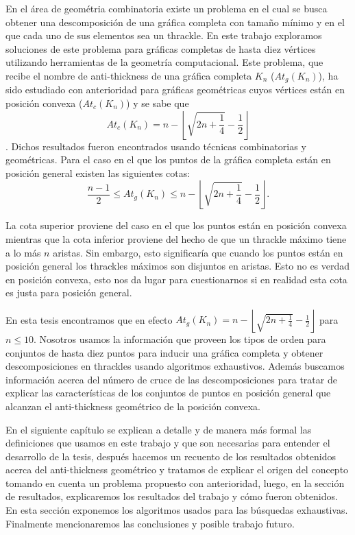 En el área de geométria combinatoria existe un problema en el cual se busca
obtener una descomposición de una gráfica completa con tamaño mínimo y en el
que cada uno de sus elementos sea un thrackle. En este trabajo exploramos
soluciones de este problema para gráficas completas de hasta diez vértices
utilizando herramientas de la geometría computacional.
Este problema, que recibe el nombre de anti-thickness de una gráfica completa $K_n$ ($At_g(K_n)$), ha sido estudiado con anterioridad %
para gráficas geométricas cuyos vértices están en posición convexa ($At_c(K_n)$)
y se sabe que \[At_c(K_n) = n - \left\lfloor\sqrt{2n + \frac{1}{4}}- \frac{1}{2}\right\rfloor\].
Dichos resultados fueron encontrados usando técnicas combinatorias y geométricas.
Para el caso en el que los puntos de la gráfica completa están
en posición general existen las siguientes cotas:
\[ \frac{n-1}{2} \leq At_g(K_n) \leq n - \left\lfloor\sqrt{2n + \frac{1}{4}}- \frac{1}{2}\right\rfloor.\]

La cota superior proviene del caso en el que los puntos están en posición convexa
mientras que la cota inferior proviene del hecho de que un thrackle máximo tiene
a lo más $n$ aristas. Sin embargo, esto significaría que cuando los puntos
están en posición general los thrackles máximos son disjuntos en aristas. Esto
no es verdad en posición convexa, esto nos da lugar para cuestionarnos si en realidad
esta cota es justa para posición general.

En esta tesis encontramos que en efecto $At_g(K_n) = n - \left\lfloor\sqrt{2n + \frac{1}{4}}- \frac{1}{2}\right\rfloor$ para $n\leq 10$.
Nosotros usamos la información que proveen los tipos de orden para conjuntos de hasta diez puntos para inducir una
gráfica completa y obtener descomposiciones en thrackles usando algoritmos exhaustivos. Además buscamos información
acerca del número de cruce de las descomposiciones para tratar de explicar las características de los conjuntos
de puntos en posición general que alcanzan el anti-thickness geométrico de la posición convexa.

En el siguiente capítulo se explican a detalle y de manera más formal las definiciones que usamos en este trabajo y que
son necesarias para entender el desarrollo de la tesis, después hacemos un recuento de los resultados
obtenidos acerca del anti-thickness geométrico y tratamos de explicar el origen del concepto tomando en cuenta
un problema propuesto con anterioridad, luego, en la sección de resultados, explicaremos los resultados del trabajo y cómo fueron
obtenidos. En esta sección exponemos los algoritmos usados para las búsquedas exhaustivas. Finalmente
mencionaremos las conclusiones y posible trabajo futuro.

